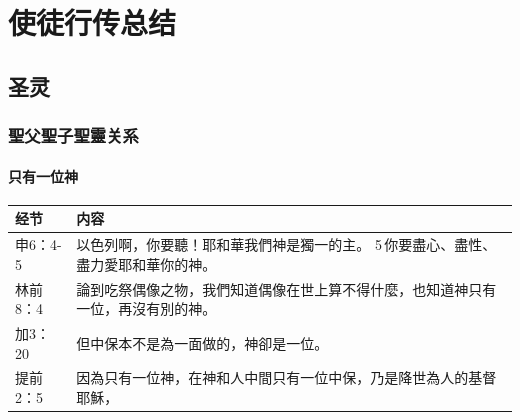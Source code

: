\chapter{使徒行传总结}

\section{圣灵}
\subsection{聖父聖子聖靈关系}

\subsubsection{只有一位神}
\begin{table}[H]
\centering
\begin{tabular}{p{6em}p{41em}}  \toprule
经节&内容 \\  \midrule
申6：4-5&以色列啊，你要聽！耶和華我們神是獨一的主。 5 你要盡心、盡性、盡力愛耶和華你的神。 \\  \midrule
林前8：4&論到吃祭偶像之物，我們知道偶像在世上算不得什麼，也知道神只有一位，再沒有別的神。\\  \midrule
加3：20&但中保本不是為一面做的，神卻是一位。 \\  \midrule
提前2：5&因為只有一位神，在神和人中間只有一位中保，乃是降世為人的基督耶穌，\\  \midrule
\bottomrule
\end{tabular}%
\end{table}

